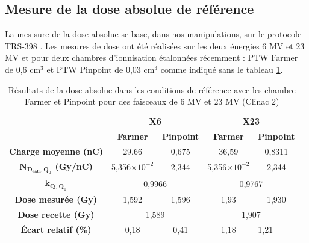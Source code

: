 \documentclass{article}
\begin{document}
\subsection{Mesure de la dose absolue de référence}

La mes sure de la dose absolue se base, dans nos manipulations, sur le protocole TRS-398 \cite{international2001iaea}. Les mesures de dose ont été réalisées sur les deux énergies 6 MV et 23 MV et pour deux chambres d'ionnisation étalonnées récemment : PTW  Farmer de 0,6 cm$^3$ et PTW Pinpoint de 0,03 cm$^3$ comme indiqué sans le tableau \ref*{table_dose_abs_resultats}.

\begin{table}[h!]
  \centering
  \begin{tabular}{c|cc|cc|}
  \cline{2-5}
                                             & \multicolumn{2}{c|}{\textbf{X6}}    & \multicolumn{2}{c|}{\textbf{X23}}   \\ \cline{2-5} 
                                             & \textbf{Farmer} & \textbf{Pinpoint} & \textbf{Farmer} & \textbf{Pinpoint} \\ \hline
  \multicolumn{1}{|c|}{\textbf{Charge moyenne (nC)}} & 29,66           & 0,675             & 36,59           & 0,8311            \\
  \multicolumn{1}{|c|}{\textbf{$\mathbf{N_{D_{eau},\, Q_0}}$ (Gy/nC)}} & 5,356$\times 10^{-2}$ & 2,344 & 5,356$\times 10^{-2}$ & 2,344                     \\
  \multicolumn{1}{|c|}{\textbf{$\mathbf{k_{Q,\, Q_0}}$}}       & \multicolumn{2}{c|}{0,9966}   & \multicolumn{2}{c|}{0,9767}                       \\
  \multicolumn{1}{|c|}{\textbf{Dose mesurée (Gy)}}   & 1,592           & 1,596             & 1,93            & 1,930             \\
  \multicolumn{1}{|c|}{\textbf{Dose recette (Gy)}}             & \multicolumn{2}{c|}{1,589}    & \multicolumn{2}{c|}{1,907}                        \\
  \multicolumn{1}{|c|}{\textbf{Écart relatif (\%)}}            & 0,18                  & 0,41  & 1,18                  & \multicolumn{1}{l|}{1,21} \\ \hline
  \end{tabular}
  \caption{Résultats de la dose absolue dans les conditions de référence avec les chambre Farmer et Pinpoint pour des faisceaux de 6 MV et 23 MV (Clinac 2)}
  \label{table_dose_abs_resultats}
\end{table}
\end{document}
